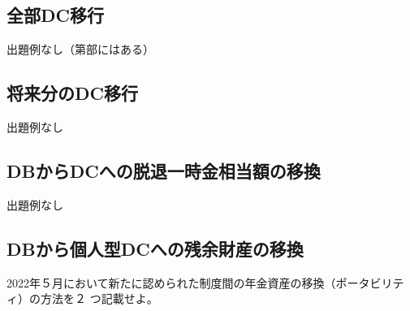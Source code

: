 \newpage

\subsection{全部DC移行}

出題例なし（第部にはある）

\newpage

\subsection{将来分のDC移行}

出題例なし

\newpage

\subsection{DBからDCへの脱退一時金相当額の移換}

出題例なし

\newpage

\subsection{DBから個人型DCへの残余財産の移換}


\begin{shortanswer}
  2022年５月において新たに認められた制度間の年金資産の移換（ポータビリティ）の方法を２
つ記載せよ。
\end{shortanswer}

